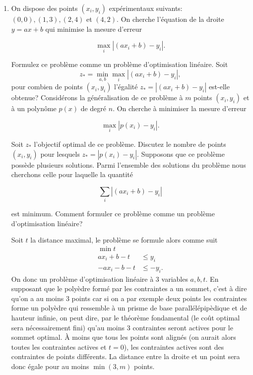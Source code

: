 \begin{enumerate}
    \begin{solution}
      \nosolution
    \end{solution}

  \item On dispose des points $(x_i, y_i)$ expérimentaux suivants: $(0, 0), (1, 3), (2, 4)$ et $(4, 2)$. On cherche l'équation de la
    droite $y=ax+b$ qui minimise la mesure d'erreur

    $$\max_i | (ax_i+b)-y_i |.$$

    Formulez ce problème comme un problème d'optimisation linéaire. Soit
    $$z_* = \min_{a, b} \max_i|(ax_i+b)-y_i|,$$ pour combien de points
    $(x_i, y_i)$ l'égalité
    $z_*= | (ax_i+b)-y_i |$ est-elle obtenue? Considérons la généralisation de ce problème à $m$ points $(x_i, y_i)$ et à un polynôme $p(x)$ de degré $n$. On
    cherche à minimiser la mesure d'erreur

    $$\max_i | p(x_i)-y_i |.$$

    Soit $z_*$ l'objectif optimal de ce problème. Discutez le nombre de points $(x_i, y_i)$ pour lesquels $z_*= | p(x_i)-y_i|$. Supposons que ce problème
    possède plusieurs solutions. Parmi l'ensemble des solutions du problème nous cherchons celle pour laquelle la quantité

    $$\sum_i | (ax_i+b)-y_i |$$

    est minimum. Comment formuler ce problème comme un problème d'optimisation linéaire?




    \begin{solution}
      Soit $t$ la distance maximal, le problème se formule alors comme suit
      \begin{align*}
        \min t\\
        ax_i + b - t & \leq y_i\\
        -ax_i - b - t & \leq -y_i.
      \end{align*}
      On donc un problème d'optimisation linéaire à 3 variables $a,b,t$.
      En supposant que le polyèdre formé par les contraintes a un sommet,
      c'est à dire qu'on a au moins 3 points car si on a par exemple
      deux points les contraintes forme un polyèdre qui ressemble à
      un prisme de base parallélépipèdique et de hauteur infinie,
      on peut dire, par le théorème fondamental
      (le coût optimal sera nécessairement fini)
      qu'au moins 3 contraintes seront actives pour le sommet optimal.
      À moins que tous les points sont alignés (on aurait alors toutes
      les contraintes actives et $t=0$),
      les contraintes actives sont des contraintes de points différents.
      La distance entre la droite et un point
      sera donc égale pour au moins $\min(3,m)$ points.


\end{solution}
\end{enumerate}
